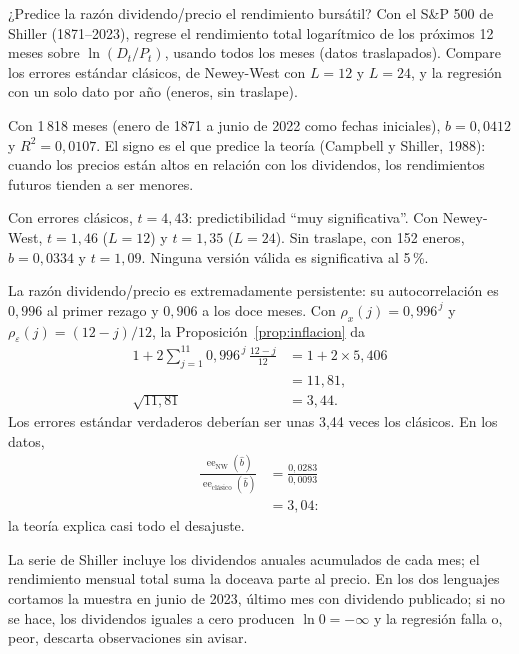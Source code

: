 \begin{ejresuelto}{¿Predice la razón dividendo/precio el rendimiento bursátil?}\label{ej:dprediccion}
\enunciado Con el S\&P 500 de Shiller (1871--2023), regrese el rendimiento total logarítmico de los próximos
12 meses sobre $\ln(D_t/P_t)$, usando todos los meses (datos traslapados). Compare los errores estándar
clásicos, de Newey-West con $L=12$ y $L=24$, y la regresión con un solo dato por año (eneros, sin traslape).

\solucion
{} Con 1\,818 meses (enero de 1871 a junio de 2022 como fechas iniciales),
$\hat b=0{,}0412$ y $R^2=0{,}0107$. El signo es el que predice la teoría (Campbell y Shiller, 1988): cuando los
precios están altos en relación con los dividendos, los rendimientos futuros tienden a ser menores.

 Con errores clásicos, $t=4{,}43$: predictibilidad ``muy significativa''. Con
Newey-West, $t=1{,}46$ ($L=12$) y $t=1{,}35$ ($L=24$). Sin traslape, con 152 eneros, $\hat b=0{,}0334$ y
$t=1{,}09$. Ninguna versión válida es significativa al 5\,\%.

 La razón dividendo/precio es extremadamente persistente: su
autocorrelación es $0{,}996$ al primer rezago y $0{,}906$ a los doce meses. Con $\rho_x(j)=0{,}996^{\,j}$ y
$\rho_\varepsilon(j)=(12-j)/12$, la Proposición~\ref{prop:inflacion} da
\begin{align*}
  1+2\sum_{j=1}^{11}0{,}996^{\,j}\,\frac{12-j}{12} &= 1+2\times5{,}406\\
                                                    &= 11{,}81,\\
  \sqrt{11{,}81}                                    &= 3{,}44 .
\end{align*}
Los errores estándar verdaderos deberían ser unas 3,44 veces los clásicos. En los datos,
\begin{align*}
  \frac{\operatorname{ee}_{\mathrm{NW}}(\hat b)}{\operatorname{ee}_{\text{clásico}}(\hat b)} &= \frac{0{,}0283}{0{,}0093}\\
                                                                                         &= 3{,}04 :
\end{align*}
la teoría explica casi todo el desajuste.


\RvsPy La serie de Shiller incluye los dividendos anuales acumulados de cada mes; el rendimiento mensual
total suma la doceava parte al precio. En los dos lenguajes cortamos la muestra en junio de 2023, último mes
con dividendo publicado; si no se hace, los dividendos iguales a cero producen $\ln 0=-\infty$ y la regresión
falla o, peor, descarta observaciones sin avisar.


\end{ejresuelto}
